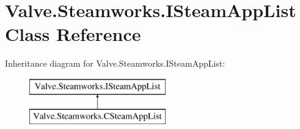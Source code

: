 \hypertarget{classValve_1_1Steamworks_1_1ISteamAppList}{}\section{Valve.\+Steamworks.\+I\+Steam\+App\+List Class Reference}
\label{classValve_1_1Steamworks_1_1ISteamAppList}
Inheritance diagram for Valve.\+Steamworks.\+I\+Steam\+App\+List\+:\begin{figure}[H]
\begin{center}
\leavevmode
\includegraphics[height=2.000000cm]{classValve_1_1Steamworks_1_1ISteamAppList}
\end{center}
\end{figure}
